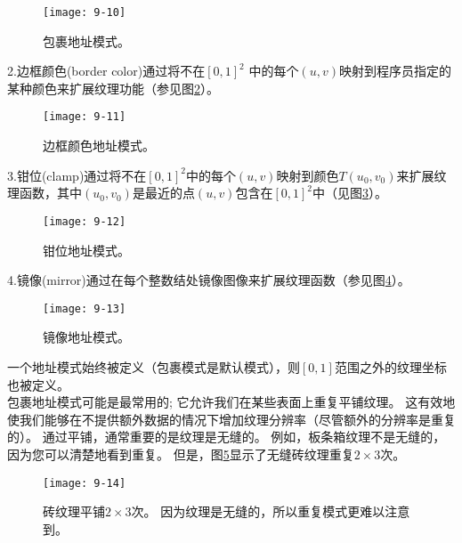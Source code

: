 \begin{figure}[h]
    \label{fig:9-10}
    \texttt{[image: 9-10]}
    \centering
    \caption{包裹地址模式。}
\end{figure}

\begin{flushleft}
2.边框颜色(border color)通过将不在$[0,1]^{2}$ 中的每个$(u,v)$映射到程序员指定的某种颜色来扩展纹理功能（参见图\ref{fig:9-11}）。
\end{flushleft}

\begin{figure}[h]
    \label{fig:9-11}
    \texttt{[image: 9-11]}
    \centering
    \caption{边框颜色地址模式。}
\end{figure}

\begin{flushleft}
3.钳位(clamp)通过将不在$[0,1]^{2}$中的每个$(u,v)$映射到颜色$T(u_{0},v_{0})$来扩展纹理函数，其中$(u_{0},v_{0})$是最近的点$(u,v)$包含在$[0,1]^{2}$中（见图\ref{fig:9-12}）。
\end{flushleft}

\begin{figure}[h]
    \label{fig:9-12}
    \texttt{[image: 9-12]}
    \centering
    \caption{钳位地址模式。}
\end{figure}

\begin{flushleft}
4.镜像(mirror)通过在每个整数结处镜像图像来扩展纹理函数（参见图\ref{fig:9-13}）。
\end{flushleft}

\begin{figure}[h]
    \label{fig:9-13}
    \texttt{[image: 9-13]}
    \centering
    \caption{镜像地址模式。}
\end{figure}

\begin{flushleft}
一个地址模式始终被定义（包裹模式是默认模式），则$[0,1]$范围之外的纹理坐标也被定义。\\
包裹地址模式可能是最常用的; 它允许我们在某些表面上重复平铺纹理。 这有效地使我们能够在不提供额外数据的情况下增加纹理分辨率（尽管额外的分辨率是重复的）。 通过平铺，通常重要的是纹理是无缝的。 例如，板条箱纹理不是无缝的，因为您可以清楚地看到重复。 但是，图\ref{fig:9-14}显示了无缝砖纹理重复$2\times 3$次。
\end{flushleft}

\begin{figure}[h]
    \label{fig:9-14}
    \texttt{[image: 9-14]}
    \centering
    \caption{砖纹理平铺$2\times 3$次。 因为纹理是无缝的，所以重复模式更难以注意到。}
\end{figure}

